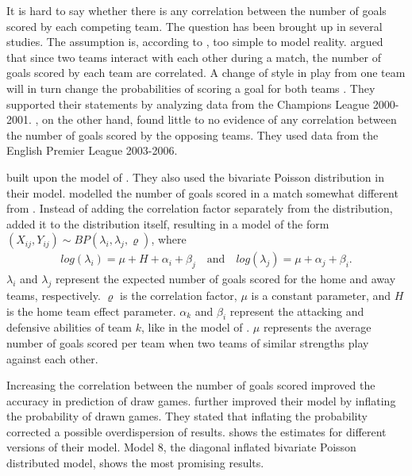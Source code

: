 It is hard to say whether there is any correlation between the number of goals scored by each competing team. The question has been brought up in several studies. The assumption is, according to \citet{bib:maher-1982}, too simple to model reality. \citet{bib:karlis-ntzoufras-2003} argued that since two teams interact with each other during a match, the number of goals scored by each team are correlated. A change of style in play from one team will in turn change the probabilities of scoring a goal for both teams \citep{bib:karlis-ntzoufras-2003}. They supported their statements by analyzing data from the Champions League 2000-2001. \citet{bib:mchale-scarf-2007}, on the other hand, found little to no evidence of any correlation between the number of goals scored by the opposing teams. They used data from the English Premier League 2003-2006.

\citet{bib:karlis-ntzoufras-2003} built upon the model of \citet{bib:maher-1982}. They also used the bivariate Poisson distribution in their model. \citet{bib:karlis-ntzoufras-2003} modelled the number of goals scored in a match somewhat different from \citet{bib:maher-1982}. Instead of adding the correlation factor separately from the distribution, \citet{bib:karlis-ntzoufras-2003} added it to the distribution itself, resulting in a model of the form $(X_{ij}, Y_{ij}) \sim BP(\lambda_{i}, \lambda_{j}, \varrho)$, where
\begin{equation}
    \begin{aligned}
        log(\lambda_{i}) = \mu + H + \alpha_{i} + \beta_{j}
        \quad \text{and} \quad
        log(\lambda_{j}) = \mu + \alpha_{j} + \beta_{i}.
    \end{aligned}
    \label{eq:karlis-ntzoufras-model}
\end{equation}
$\lambda_{i}$ and $\lambda_{j}$ represent the expected number of goals scored for the home and away teams, respectively. $\varrho$ is the correlation factor, $\mu$ is a constant parameter, and $H$ is the home team effect parameter. $\alpha_{k}$ and $\beta_{i}$ represent the attacking and defensive abilities of team $k$, like in the model of \citet{bib:maher-1982}. $\mu$ represents the average number of goals scored per team when two teams of similar strengths play against each other.

Increasing the correlation between the number of goals scored improved the accuracy in prediction of draw games. \citet{bib:karlis-ntzoufras-2003} further improved their model by inflating the probability of drawn games. They stated that inflating the probability corrected a possible overdispersion of results.  shows the estimates for different versions of their model. Model 8, the diagonal inflated bivariate Poisson distributed model, shows the most promising results.

